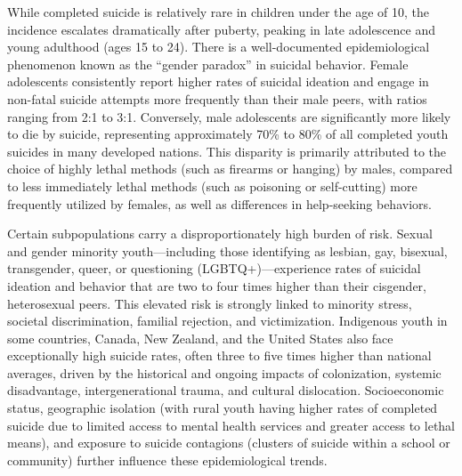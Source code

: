 While completed suicide is relatively rare in children under the age of 10, the incidence escalates dramatically after puberty, peaking in late adolescence and young adulthood (ages 15 to 24). There is a well-documented epidemiological phenomenon known as the ``gender paradox'' in suicidal behavior. Female adolescents consistently report higher rates of suicidal ideation and engage in non-fatal suicide attempts more frequently than their male peers, with ratios ranging from 2:1 to 3:1. Conversely, male adolescents are significantly more likely to die by suicide, representing approximately 70\% to 80\% of all completed youth suicides in many developed nations. This disparity is primarily attributed to the choice of highly lethal methods (such as firearms or hanging) by males, compared to less immediately lethal methods (such as poisoning or self-cutting) more frequently utilized by females, as well as differences in help-seeking behaviors.

Certain subpopulations carry a disproportionately high burden of risk. Sexual and gender minority youth---including those identifying as lesbian, gay, bisexual, transgender, queer, or questioning (LGBTQ+)---experience rates of suicidal ideation and behavior that are two to four times higher than their cisgender, heterosexual peers. This elevated risk is strongly linked to minority stress, societal discrimination, familial rejection, and victimization. Indigenous youth in some countries, Canada, New Zealand, and the United States also face exceptionally high suicide rates, often three to five times higher than national averages, driven by the historical and ongoing impacts of colonization, systemic disadvantage, intergenerational trauma, and cultural dislocation. Socioeconomic status, geographic isolation (with rural youth having higher rates of completed suicide due to limited access to mental health services and greater access to lethal means), and exposure to suicide contagions (clusters of suicide within a school or community) further influence these epidemiological trends.

